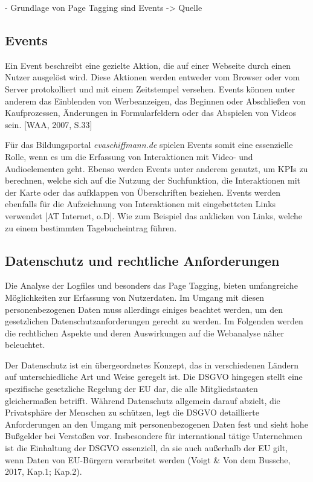 - Grundlage von Page Tagging sind Events -> Quelle

\subsection{Events}
Ein Event beschreibt eine gezielte Aktion, die auf einer Webseite durch einen Nutzer ausgelöst wird. Diese Aktionen werden entweder vom Browser oder vom Server protokolliert und mit einem Zeitstempel versehen. Events können unter anderem das Einblenden von Werbeanzeigen, das Beginnen oder Abschließen von Kaufprozessen, Änderungen in Formularfeldern oder das Abspielen von Videos sein. [WAA, 2007, S.33]

Für das Bildungsportal \textit{evaschiffmann.de} spielen Events somit eine essenzielle Rolle, wenn es um die Erfassung von Interaktionen mit Video- und Audioelementen geht. Ebenso werden Events unter anderem genutzt, um KPIs zu berechnen, welche sich auf die Nutzung der Suchfunktion, die Interaktionen mit der Karte oder das aufklappen von Überschriften beziehen. Events werden ebenfalls für die Aufzeichnung von Interaktionen mit eingebetteten Links verwendet [AT Internet, o.D]. Wie zum Beispiel das anklicken von Links, welche zu einem bestimmten Tagebucheintrag führen.

\subsection{Datenschutz und rechtliche Anforderungen}
Die Analyse der Logfiles und besonders das Page Tagging, bieten umfangreiche Möglichkeiten zur Erfassung von Nutzerdaten. Im Umgang mit diesen personenbezogenen Daten muss allerdings einiges beachtet werden, um den gesetzlichen Datenschutzanforderungen gerecht zu werden. Im Folgenden werden die rechtlichen Aspekte und deren Auswirkungen auf die Webanalyse näher beleuchtet.

Der Datenschutz ist ein übergeordnetes Konzept, das in verschiedenen Ländern auf unterschiedliche Art und Weise geregelt ist. Die DSGVO hingegen stellt eine spezifische gesetzliche Regelung der EU dar, die alle Mitgliedstaaten gleichermaßen betrifft. Während Datenschutz allgemein darauf abzielt, die Privatsphäre der Menschen zu schützen, legt die DSGVO detaillierte Anforderungen an den Umgang mit personenbezogenen Daten fest und sieht hohe Bußgelder bei Verstoßen vor. Insbesondere für international tätige Unternehmen ist die Einhaltung der DSGVO essenziell, da sie auch außerhalb der EU gilt, wenn Daten von EU-Bürgern verarbeitet werden (Voigt \& Von dem Bussche, 2017, Kap.1; Kap.2).

